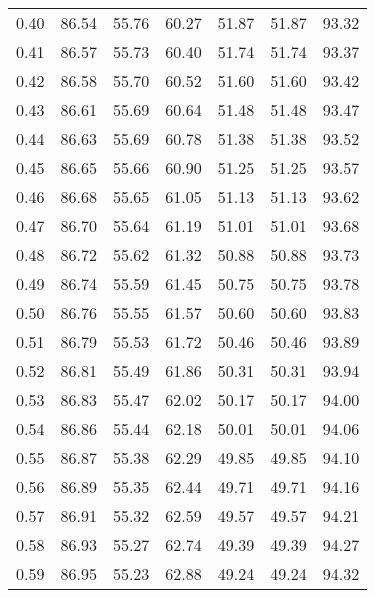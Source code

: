 \begin{tabular}{|c|c|c|c|c|c|c|}
      0.40 &     86.54 &     55.76 &      60.27 &   51.87 &      51.87 &         93.32 \\
      0.41 &     86.57 &     55.73 &      60.40 &   51.74 &      51.74 &         93.37 \\
      0.42 &     86.58 &     55.70 &      60.52 &   51.60 &      51.60 &         93.42 \\
      0.43 &     86.61 &     55.69 &      60.64 &   51.48 &      51.48 &         93.47 \\
      0.44 &     86.63 &     55.69 &      60.78 &   51.38 &      51.38 &         93.52 \\
      0.45 &     86.65 &     55.66 &      60.90 &   51.25 &      51.25 &         93.57 \\
      0.46 &     86.68 &     55.65 &      61.05 &   51.13 &      51.13 &         93.62 \\
      0.47 &     86.70 &     55.64 &      61.19 &   51.01 &      51.01 &         93.68 \\
      0.48 &     86.72 &     55.62 &      61.32 &   50.88 &      50.88 &         93.73 \\
      0.49 &     86.74 &     55.59 &      61.45 &   50.75 &      50.75 &         93.78 \\
      0.50 &     86.76 &     55.55 &      61.57 &   50.60 &      50.60 &         93.83 \\
      0.51 &     86.79 &     55.53 &      61.72 &   50.46 &      50.46 &         93.89 \\
      0.52 &     86.81 &     55.49 &      61.86 &   50.31 &      50.31 &         93.94 \\
      0.53 &     86.83 &     55.47 &      62.02 &   50.17 &      50.17 &         94.00 \\
      0.54 &     86.86 &     55.44 &      62.18 &   50.01 &      50.01 &         94.06 \\
      0.55 &     86.87 &     55.38 &      62.29 &   49.85 &      49.85 &         94.10 \\
      0.56 &     86.89 &     55.35 &      62.44 &   49.71 &      49.71 &         94.16 \\
      0.57 &     86.91 &     55.32 &      62.59 &   49.57 &      49.57 &         94.21 \\
      0.58 &     86.93 &     55.27 &      62.74 &   49.39 &      49.39 &         94.27 \\
      0.59 &     86.95 &     55.23 &      62.88 &   49.24 &      49.24 &         94.32 \\

\end{tabular}
